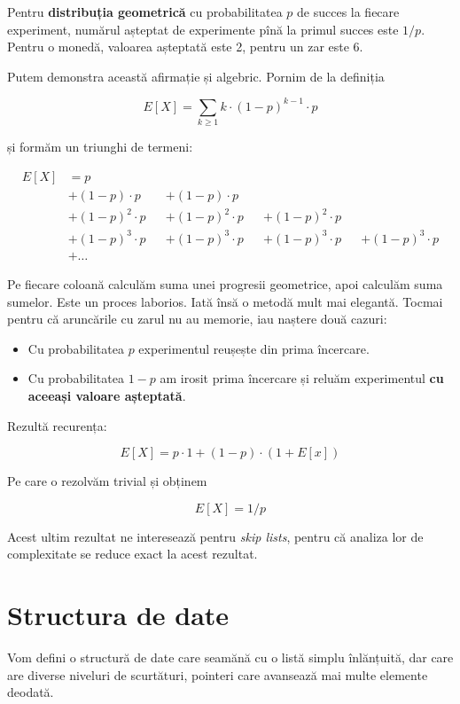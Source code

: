 \documentclass[../main.tex]{subfiles}
\begin{document}
Pentru \textbf{distribuția geometrică} cu probabilitatea $p$ de succes la fiecare experiment, numărul așteptat de experimente pînă la primul succes este $1/p$. Pentru o monedă, valoarea așteptată este 2, pentru un zar este 6.

Putem demonstra această afirmație și algebric. Pornim de la definiția

$$E[X] = \sum_{k \geq 1} k \cdot (1 - p)^{k-1} \cdot p$$

și formăm un triunghi de termeni:

\begin{align*}
  E[X] &= p\\
       &+ (1 - p) \cdot p &&+ (1 - p) \cdot p\\
       &+ (1 - p)^2 \cdot p &&+ (1 - p)^2 \cdot p &&+ (1 - p)^2 \cdot p\\
       &+ (1 - p)^3 \cdot p &&+ (1 - p)^3 \cdot p &&+ (1 - p)^3 \cdot p &&+ (1 - p)^3 \cdot p\\
       &+ \dots
\end{align*}

Pe fiecare coloană calculăm suma unei progresii geometrice, apoi calculăm suma sumelor. Este un proces laborios. Iată însă o metodă mult mai elegantă. Tocmai pentru că aruncările cu zarul nu au memorie, iau naștere două cazuri:

\begin{itemize}
  \item Cu probabilitatea $p$ experimentul reușește din prima încercare.
  \item Cu probabilitatea $1-p$ am irosit prima încercare și reluăm experimentul \textbf{cu aceeași valoare așteptată}.
\end{itemize}

Rezultă recurența:

$$E[X] = p \cdot 1 + (1 - p) \cdot (1 + E[x])$$

Pe care o rezolvăm trivial și obținem

$$E[X] = 1/p$$

Acest ultim rezultat ne interesează pentru \textit{skip lists}, pentru că analiza lor de complexitate se reduce exact la acest rezultat.


\section{Structura de date}

Vom defini o structură de date care seamănă cu o listă simplu înlănțuită, dar care are diverse niveluri de scurtături, pointeri care avansează mai multe elemente deodată.
\end{document}
